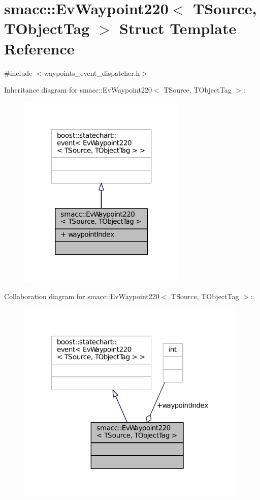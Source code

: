 \hypertarget{structsmacc_1_1EvWaypoint220}{}\section{smacc\+:\+:Ev\+Waypoint220$<$ T\+Source, T\+Object\+Tag $>$ Struct Template Reference}
\label{structsmacc_1_1EvWaypoint220}


{\ttfamily \#include $<$waypoints\+\_\+event\+\_\+dispatcher.\+h$>$}



Inheritance diagram for smacc\+:\+:Ev\+Waypoint220$<$ T\+Source, T\+Object\+Tag $>$\+:
\nopagebreak
\begin{figure}[H]
\begin{center}
\leavevmode
\includegraphics[width=227pt]{structsmacc_1_1EvWaypoint220__inherit__graph}
\end{center}
\end{figure}


Collaboration diagram for smacc\+:\+:Ev\+Waypoint220$<$ T\+Source, T\+Object\+Tag $>$\+:
\nopagebreak
\begin{figure}[H]
\begin{center}
\leavevmode
\includegraphics[width=312pt]{structsmacc_1_1EvWaypoint220__coll__graph}
\end{center}
\end{figure}
